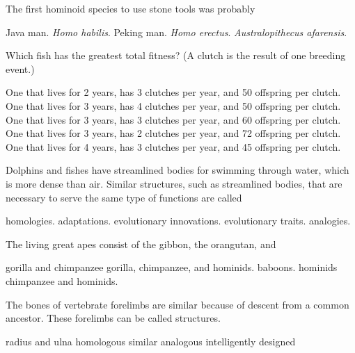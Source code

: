 \newpage

\question
The first hominoid species to use stone tools was probably

\begin{choices}
\choice Java man.
\correctchoice \textit{Homo habilis}.
\choice Peking man.
\choice \textit{Homo erectus}.
\choice \textit{Australopithecus afarensis}.
\end{choices}

\question
Which fish has the greatest total fitness? (A clutch is the result of one breeding event.)

\begin{choices}
\choice One that lives for 2 years, has 3 clutches per year, and 50 offspring per clutch.
\correctchoice One that lives for 3 years, has 4 clutches per year, and 50 offspring per clutch.
\choice One that lives for 3 years, has 3 clutches per year, and 60 offspring per clutch.
\choice One that lives for 3 years, has 2 clutches per year, and 72 offspring per clutch.
\choice One that lives for 4 years, has 3 clutches per year, and 45 offspring per clutch.
\end{choices}

\question
Dolphins and fishes have streamlined bodies for swimming through water, which is more dense than air. Similar structures, such as streamlined bodies, that are necessary to serve the same type of functions are called

\begin{choices}
\choice homologies.
\choice adaptations.
\choice evolutionary innovations.
\choice evolutionary traits.
\correctchoice analogies.
\end{choices}

\question
The living great apes consist of the gibbon, the orangutan, and

\begin{choices}
\choice gorilla and chimpanzee
\correctchoice gorilla, chimpanzee, and hominids.
\choice baboons.
\choice hominids
\choice chimpanzee and hominids.
\end{choices}

\question
The bones of vertebrate forelimbs are similar because of descent from a common ancestor. These forelimbs can be called \underline{\hspace{2cm}} structures.

\begin{choices}
\choice radius and ulna
\correctchoice homologous
\choice similar
\choice analogous
\choice intelligently designed
\end{choices}

